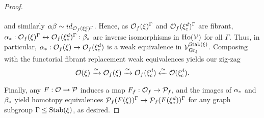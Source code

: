 \documentclass[a4paper,10pt
]{article}%
\renewcommand{\1}{\ensuremath{\mathbb{id}}}
\begin{document}
\begin{proof}
\begin{equation}
\begin{tikzcd}
            \end{tikzcd}
      \end{equation}
      and similarly $\alpha\beta \sim id_{\mathcal{O}_f(\xi_c^d)^\Gamma}$.
      Hence, as $\mathcal{O}_f(\xi)^\Gamma$ and $\mathcal{O}_f(\xi_c^d)^\Gamma$ are fibrant,
      $\alpha_{\**}: \O_f(\ksi)^\Gamma \leftrightarrow \O_f(\ksi_c^d)^\Gamma : \beta_{\**}$ are inverse isomorphisms in $\operatorname{Ho}(\mathcal V)$ for all $\Gamma$.
      Thus, in particular, $\alpha_{\**}: \O_f(\ksi) \to \O_f(\ksi_c^d)$ is a weak equivalence in $\mathcal V^{\mathrm{Stab}(\xi)}_{\mathrm{Gr}_\xi}$.
      Composing with the functorial fibrant replacement weak equivalences yields our zig-zag
      \begin{equation}
            \mathcal{O}(\xi) \xrightarrow{\simeq} \mathcal{O}_f(\xi) \xrightarrow{\simeq} \mathcal{O}_f(\xi_c^d) \xleftarrow{\simeq} \mathcal{O}(\xi_c^d).
      \end{equation}
      
      Finally, any $F: \mathcal{O} \to \mathcal{P}$ induces a map $F_f: \mathcal{O}_f \to \mathcal{P}_f$, and
      the images of $\alpha_{\**}$ and $\beta_{\**}$ yield
      homotopy equivalences $\mathcal{P}_f(F(\xi))^\Gamma \to \mathcal{P}_f(F(\xi_c^d))^\Gamma$ for any graph subgroup $\Gamma \leq \mathrm{Stab}(\xi)$,
      as desired.
\end{proof}
\end{document}
